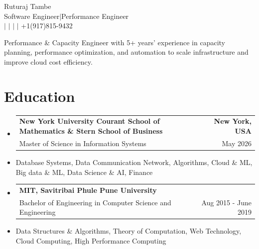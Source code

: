 \documentclass[letterpaper,11pt]{article}
\makeatletter
\newcommand{\resumeItem}[1]{
  \item\small{{#1 \vspace{-1pt}}}
}
\newcommand{\resumeSubheading}[4]{
  \vspace{-2pt}\item
  \begin{tabular*}{1.0\textwidth}[t]{l@{\extracolsep{\fill}}r}
    \textbf{\large#1} & \textbf{\small #2} \\
    \normalsize{\large#3} & \normalsize{\small #4} \\
  \end{tabular*}\vspace{-7pt}
}
\newcommand{\resumeSubItem}[1]{\resumeItem{#1}\vspace{-4pt}}
\newcommand{\resumeSubHeadingListStart}{
  \begin{itemize}[leftmargin=0.0in, label={}]
}
\newcommand{\resumeSubHeadingListEnd}{\end{itemize}}
\makeatother
\begin{document}

\begin{center}
  {\LARGE Ruturaj Tambe} \\ \vspace{2pt}
  \footnotesize Software Engineer$|$Performance Engineer\\
  \footnotesize
  \href{mailto:rvt2018@nyu.edu}{\color{blue}{rvt2018@nyu.edu}}$|$
  \href{https://www.linkedin.com/in/ruturaj-tambe-929364169}{\color{blue}{LinkedIn}}
  $|$
  \href{https://github.com/Ruturaj-Vasant}{\color{blue}{GitHub}}$|$
  \href{https://ruturaj-vasant.github.io/}{\color{blue}{Portfolio}}$|$
  +1(917)815-9432
  \vspace{-7pt}
\end{center}
\vspace{-12pt}
\begin{center}
  \normalsize{Performance \& Capacity Engineer with 5+ years’ experience in capacity planning, performance optimization, and automation to scale infrastructure and improve cloud cost efficiency.}
\end{center}

\vspace{-30pt}

\section{\color{airforceblue}Education}
\resumeSubHeadingListStart

\resumeSubheading
  {New York University Courant School of Mathematics \& Stern School of
  Business}{New York, USA}
  {Master of Science in Information Systems}{May 2026 }
\resumeSubItem{Database Systems, Data Communication Network, Algorithms,
Cloud \& ML, Big data \& ML, Data Science \& AI, Finance}

\vspace{4pt}

\resumeSubheading
  {MIT, Savitribai Phule Pune University }{}
  {Bachelor of Engineering in Computer Science and Engineering}
  {Aug 2015 - June 2019}
\resumeSubItem{Data Structures \& Algorithms, Theory of Computation, Web
Technology, Cloud Computing, High Performance Computing}

\resumeSubHeadingListEnd

\vspace{-16pt}

\end{document}

